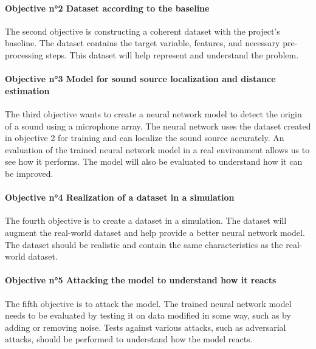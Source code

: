 \paragraph{Objective n°2 Dataset according to the baseline}
\label{intro:objective2}

The second objective is constructing a coherent dataset with the project's baseline. The dataset contains the target variable, features, and necessary pre-processing steps. This dataset will help represent and understand the problem.

\paragraph{Objective n°3 Model for sound source localization and distance estimation}
\label{intro:objective3}

The third objective wants to create a neural network model to detect the origin of a sound using a microphone array. The neural network uses the dataset created in objective 2 for training and can localize the sound source accurately. An evaluation of the trained neural network model in a real environment allows us to see how it performs. The model will also be evaluated to understand how it can be improved.

\paragraph{Objective n°4 Realization of a dataset in a simulation}
\label{intro:objective4}

The fourth objective is to create a dataset in a simulation. The dataset will augment the real-world dataset and help provide a better neural network model. The dataset should be realistic and contain the same characteristics as the real-world dataset.

\paragraph{Objective n°5 Attacking the model to understand how it reacts}
\label{intro:objective5}

The fifth objective is to attack the model. The trained neural network model needs to be evaluated by testing it on data modified in some way, such as by adding or removing noise. Tests against various attacks, such as adversarial attacks, should be performed to understand how the model reacts.


